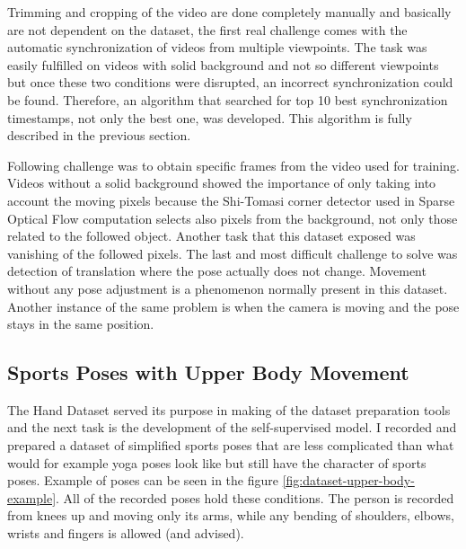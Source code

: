 Trimming and cropping of the video are done completely manually and basically are not dependent on the dataset, the first real challenge comes with the automatic synchronization of videos from multiple viewpoints. The task was easily fulfilled on videos with solid background and not so different viewpoints but once these two conditions were disrupted, an incorrect synchronization could be found. Therefore, an algorithm that searched for top 10 best synchronization timestamps, not only the best one, was developed. This algorithm is fully described in the previous section.

Following challenge was to obtain specific frames from the video used for training. Videos without a solid background showed the importance of only taking into account the moving pixels because the Shi-Tomasi corner detector used in Sparse Optical Flow computation selects also pixels from the background, not only those related to the followed object. Another task that this dataset exposed was vanishing of the followed pixels. The last and most difficult challenge to solve was detection of translation where the pose actually does not change. Movement without any pose adjustment is a phenomenon normally present in this dataset. Another instance of the same problem is when the camera is moving and the pose stays in the same position.

\subsection{Sports Poses with Upper Body Movement}

The Hand Dataset served its purpose in making of the dataset preparation tools and the next task is the development of the self-supervised model. I recorded and prepared a dataset of simplified sports poses that are less complicated than what would for example yoga poses look like but still have the character of sports poses. Example of poses can be seen in the figure \ref{fig:dataset-upper-body-example}. All of the recorded poses hold these conditions. The person is recorded from knees up and moving only its arms, while any bending of shoulders, elbows, wrists and fingers is allowed (and advised).

